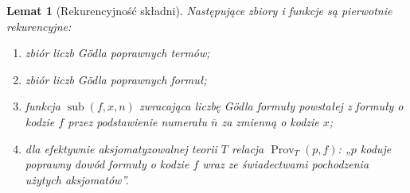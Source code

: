 \documentclass[11pt,a4paper]{article}
\numberwithin{equation}{section}
\theoremstyle{plain}
\newtheorem{lemat}[twierdzenie]{Lemat}
\theoremstyle{definition}
\theoremstyle{remark}
\begin{document}
\begin{lemat}[Rekurencyjność składni]\label{res:6:5}
Następujące zbiory i funkcje są pierwotnie rekurencyjne:
\begin{enumerate}[label=(\alph*)]
\item zbiór liczb Gödla poprawnych termów;
\item zbiór liczb Gödla poprawnych formuł;
\item funkcja $\operatorname{sub}(f,x,n)$ zwracająca liczbę Gödla formuły powstałej z formuły o kodzie $f$ przez podstawienie numerału $\overline n$ za zmienną o kodzie $x$;
\item dla efektywnie aksjomatyzowalnej teorii $T$ relacja $\operatorname{Prov}_T(p,f)$: „$p$ koduje poprawny dowód formuły o kodzie $f$ wraz ze świadectwami pochodzenia użytych aksjomatów”.
\end{enumerate}
\end{lemat}
\end{document}
